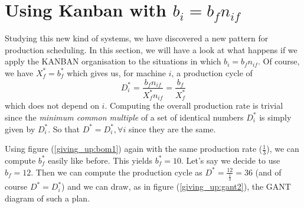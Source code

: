 \section{Using Kanban with $b_i = b_fn_{if}$}

Studying this new kind of systems, we have discovered a new pattern for production scheduling. In this section, we will have a look at what happens if we apply the KANBAN organisation to the situations in which $b_i = b_fn_{if}$. Of course, we have $X_f^* = b_f^*$ which gives us, for machine $i$, a production cycle of \[ D_i^* = \frac{b_fn_{if}}{X_f^*n_{if}} = \frac{b_f}{X_f^*} \] which does not depend on $i$. Computing the overall production rate is trivial since the \emph{minimum common multiple} of a set of identical numbers $D_i^*$ is simply given by $D_i^*$. So that $D^* = D_i^*, \forall i$ since they are the same. 

Using figure (\ref{giving_up:bom1}) again with the same production rate ($\frac{1}{3}$), we can compute $b_f^*$ easily like before. This yields $b_f^* = 10$. Let's say we decide to use $b_f = 12$. Then we can compute the production cycle as $D^* = \frac{12}{\frac{1}{3}} = 36$ (and of course $D^* = D_i^*$) and we can draw, as in figure (\ref{giving_up:gant2}), the GANT diagram of such a plan. 

